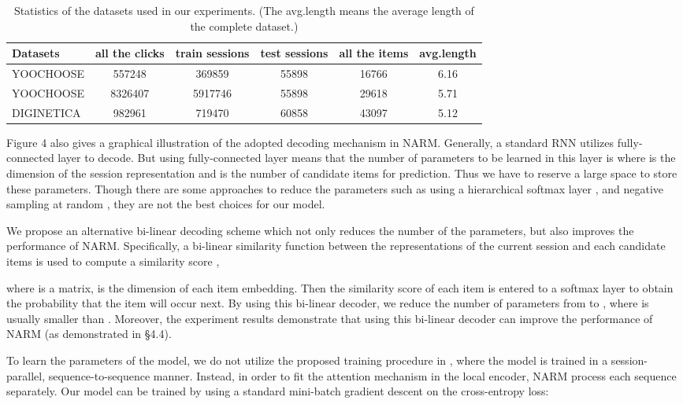 \documentclass[sigconf]{acmart}
\begin{document}
  
    \begin{table*}
        \caption{Statistics of the datasets used in our experiments. (The avg.length means the average length of the complete dataset.)}
        \label{tab:freq}
            \begin{tabular}{lccccc}
            	\toprule
            	Datasets & all the clicks & train sessions & test sessions & all the items & avg.length\\
            	\midrule
            	YOOCHOOSE  & 557248 & 369859 & 55898 & 16766 & 6.16\\
            	YOOCHOOSE  & 8326407 & 5917746 & 55898 & 29618 & 5.71\\
            	DIGINETICA & 982961 & 719470 & 60858 & 43097 & 5.12\\
            	\bottomrule
            \end{tabular}
    \end{table*}
            
Figure 4 also gives a graphical illustration of the adopted decoding mechanism in NARM. Generally, a standard RNN utilizes fully-connected layer to decode. But using fully-connected layer means that the number of parameters to be learned in this layer is  where  is the dimension of the session representation and  is the number of candidate items for prediction. Thus we have to reserve a large space to store these parameters. Though there are some approaches to reduce the parameters such as using a hierarchical softmax layer \cite{mnih2009scalable}, and negative sampling at random \cite{mikolov2013distributed}, they are not the best choices for our model.
  
We propose an alternative bi-linear decoding scheme which not only reduces the number of the parameters, but also improves the performance of NARM. Specifically, a bi-linear similarity function between the representations of the current session and each candidate items is used to compute a similarity score ,
      
where  is a  matrix,  is the dimension of each item embedding. Then the similarity score of each item is entered to a softmax layer to obtain the probability that the item will occur next. By using this bi-linear decoder, we reduce the number of parameters from  to , where  is usually smaller than . Moreover, the experiment results demonstrate that using this bi-linear decoder can improve the performance of NARM (as demonstrated in \S 4.4). 
  
To learn the parameters of the model, we do not utilize the proposed training procedure in \cite{hidasi2015session}, where the model is trained in a session-parallel, sequence-to-sequence manner. Instead, in order to fit the attention mechanism in the local encoder, NARM process each sequence  separately. Our model can be trained by using a standard mini-batch gradient descent on the cross-entropy loss:
    
\end{document}

